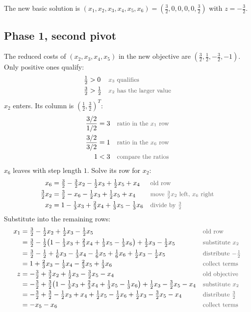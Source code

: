 \documentclass[a4paper,11pt]{article}
\newif\ifexplain
\newcommand{\teil}[1]{\subsection*{#1}}
\newcommand{\why}[1]{\text{\small\color{black!65}#1}}
\newcommand{\explain}[1]{\ifexplain\begin{erklbox}#1\end{erklbox}\fi}
\begin{document}
The new basic solution is $(x_1,x_2,x_3,x_4,x_5,x_6)=(\tfrac32,0,0,0,0,\tfrac32)$ with $z=-\tfrac32$.
\explain{Erster Schritt der Phase 1: $x_1$ steigt auf $\tfrac32$, bis die erste künstliche Variable auf null fällt. $w$ sinkt von $6$ auf $3$. $x_6$ ist immer noch $3$, also ist noch nicht fertig.}
\teil{Phase 1, second pivot}
The reduced costs of $(x_2,x_3,x_4,x_5)$ in the new objective are $(\tfrac32,\tfrac12,-\tfrac32,-1)$. Only positive ones qualify:
\begin{align*}
\tfrac12&>0&&\why{$x_3$ qualifies}\\
\tfrac32&>\tfrac12&&\why{$x_2$ has the larger value}
\end{align*}
$x_2$ enters. Its column is $(\tfrac12,\tfrac32)^T$:
\begin{align*}
\frac{3/2}{1/2}&=3&&\why{ratio in the $x_1$ row}\\
\frac{3/2}{3/2}&=1&&\why{ratio in the $x_6$ row}\\
1&<3&&\why{compare the ratios}
\end{align*}
$x_6$ leaves with step length $1$. Solve its row for $x_2$:
\begin{align*}
x_6&=\tfrac32-\tfrac32x_2-\tfrac12x_3+\tfrac12x_5+x_4&&\why{old row}\\
\tfrac32x_2&=\tfrac32-x_6-\tfrac12x_3+\tfrac12x_5+x_4&&\why{move $\tfrac32x_2$ left, $x_6$ right}\\
x_2&=1-\tfrac13x_3+\tfrac23x_4+\tfrac13x_5-\tfrac13x_6&&\why{divide by $\tfrac32$}
\end{align*}
Substitute into the remaining rows:
\begin{align*}
x_1&=\tfrac32-\tfrac12x_2+\tfrac12x_3-\tfrac12x_5&&\why{old row}\\
&=\tfrac32-\tfrac12\bigl(1-\tfrac13x_3+\tfrac23x_4+\tfrac13x_5-\tfrac13x_6\bigr)+\tfrac12x_3-\tfrac12x_5&&\why{substitute $x_2$}\\
&=\tfrac32-\tfrac12+\tfrac16x_3-\tfrac13x_4-\tfrac16x_5+\tfrac16x_6+\tfrac12x_3-\tfrac12x_5&&\why{distribute $-\tfrac12$}\\
&=1+\tfrac23x_3-\tfrac13x_4-\tfrac23x_5+\tfrac13x_6&&\why{collect terms}\\
z&=-\tfrac32+\tfrac32x_2+\tfrac12x_3-\tfrac32x_5-x_4&&\why{old objective}\\
&=-\tfrac32+\tfrac32\bigl(1-\tfrac13x_3+\tfrac23x_4+\tfrac13x_5-\tfrac13x_6\bigr)+\tfrac12x_3-\tfrac32x_5-x_4&&\why{substitute $x_2$}\\
&=-\tfrac32+\tfrac32-\tfrac12x_3+x_4+\tfrac12x_5-\tfrac12x_6+\tfrac12x_3-\tfrac32x_5-x_4&&\why{distribute $\tfrac32$}\\
&=-x_5-x_6&&\why{collect terms}
\end{align*}
\end{document}
